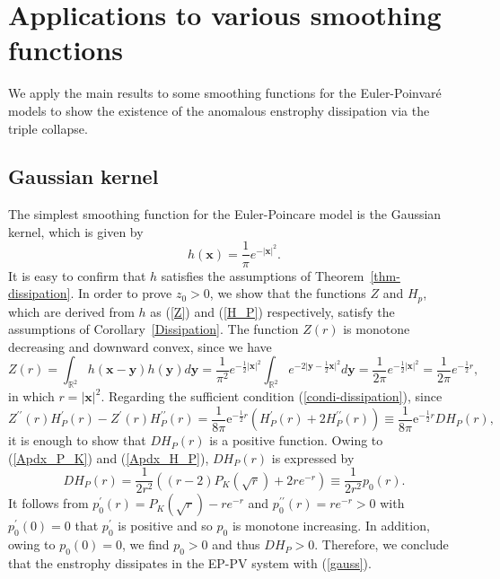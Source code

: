 \documentclass{article}
\theoremstyle{definition}
\begin{document}
\section{Applications to various smoothing functions}
\label{VBM}
We apply the main results to some smoothing functions for the Euler-Poinvar\'{e} models to show the existence of the anomalous enstrophy dissipation via the triple collapse.
\subsection{Gaussian kernel}
The simplest smoothing function for the Euler-Poincare model is the Gaussian kernel, which is given by
\begin{equation}
h({\bm x}) = \frac{1}{\pi} e^{- \vert {\bm x} \vert^2}. \label{gauss}
\end{equation}
It is easy to confirm that $h$ satisfies the assumptions of Theorem~\ref{thm-dissipation}. In order to prove $z_0 > 0$, we show that the functions $Z$ and $H_p$, which are derived from $h$ as (\ref{Z}) and (\ref{H_P}) respectively, satisfy the assumptions of Corollary~\ref{Dissipation}. The function $Z(r)$ is monotone decreasing and downward convex, since we have
\[
Z(r) = \int_{\mathbb{R}^2} h({\bm x} - {\bm y}) h({\bm y}) d{\bm y} =\frac{1}{\pi^2}  e^{ - \frac{1}{2}\vert {\bm x} \vert^2} \int_{\mathbb{R}^2} e^{ - 2 \vert {\bm y} - \frac{1}{2}{\bm x} \vert^2} d{\bm y}=\frac{1}{2 \pi}  e^{ - \frac{1}{2}\vert {\bm x} \vert^2} = \frac{1}{2 \pi}  e^{ - \frac{1}{2} r},
\]
in which $r = \vert {\bm x} \vert^2$. Regarding the sufficient condition (\ref{condi-dissipation}), since 
\begin{equation*}
Z^{\prime\prime}(r) H^\prime_P(r) - Z^\prime(r) H^{\prime\prime}_P(r) = \frac{1}{8 \pi} \mbox{e}^{-\frac{1}{2}r}\left( H_P^\prime(r) + 2 H_P^{\prime\prime}(r) \right) \equiv \frac{1}{8 \pi} \mbox{e}^{-\frac{1}{2}r} DH_P(r),
\end{equation*}
it is enough to show that $DH_P(r)$ is a positive function. Owing to (\ref{Apdx_P_K}) and (\ref{Apdx_H_P}), $DH_P(r)$ is expressed by
\[
DH_P(r) = \frac{1}{2 r^2} \left( (r -2)P_K(\sqrt{r}) + 2 r e^{- r} \right) \equiv \frac{1}{2 r^2} p_0(r).
\]
It follows from $p_0^\prime(r) = P_K(\sqrt{r}) - r e^{-r}$ and $p_0^{\prime\prime}(r) = r e^{-r} > 0$ with $p_0^{\prime}(0) = 0$ that 
$p_0^{\prime}$ is positive  and so $p_0$ is monotone increasing. In addition, owing to $p_0(0) = 0$, we find $p_0 > 0$ and thus $DH_P > 0$. Therefore, we conclude that the enstrophy dissipates in the EP-PV system with (\ref{gauss}).
\end{document}
